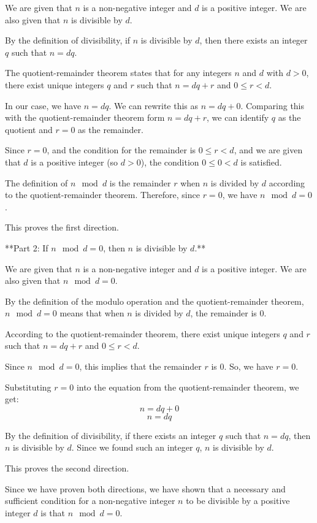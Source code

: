 \documentclass{article}
\begin{document}
We are given that $n$ is a non-negative integer and $d$ is a positive integer.
We are also given that $n$ is divisible by $d$.

By the definition of divisibility, if $n$ is divisible by $d$, then there exists an integer $q$ such that $n = dq$.

The quotient-remainder theorem states that for any integers $n$ and $d$ with $d > 0$, there exist unique integers $q$ and $r$ such that $n = dq + r$ and $0 \le r < d$.

In our case, we have $n = dq$. We can rewrite this as $n = dq + 0$.
Comparing this with the quotient-remainder theorem form $n = dq + r$, we can identify $q$ as the quotient and $r = 0$ as the remainder.

Since $r = 0$, and the condition for the remainder is $0 \le r < d$, and we are given that $d$ is a positive integer (so $d > 0$), the condition $0 \le 0 < d$ is satisfied.

The definition of $n \mod d$ is the remainder $r$ when $n$ is divided by $d$ according to the quotient-remainder theorem.
Therefore, since $r = 0$, we have $n \mod d = 0$.

This proves the first direction.

**Part 2: If $n \mod d = 0$, then $n$ is divisible by $d$.**

We are given that $n$ is a non-negative integer and $d$ is a positive integer.
We are also given that $n \mod d = 0$.

By the definition of the modulo operation and the quotient-remainder theorem, $n \mod d = 0$ means that when $n$ is divided by $d$, the remainder is 0.

According to the quotient-remainder theorem, there exist unique integers $q$ and $r$ such that $n = dq + r$ and $0 \le r < d$.

Since $n \mod d = 0$, this implies that the remainder $r$ is 0.
So, we have $r = 0$.

Substituting $r = 0$ into the equation from the quotient-remainder theorem, we get:
$$
n = dq + 0
$$
$$
n = dq
$$

By the definition of divisibility, if there exists an integer $q$ such that $n = dq$, then $n$ is divisible by $d$.
Since we found such an integer $q$, $n$ is divisible by $d$.

This proves the second direction.

Since we have proven both directions, we have shown that a necessary and sufficient condition for a non-negative integer $n$ to be divisible by a positive integer $d$ is that $n \mod d = 0$.
\end{document}

